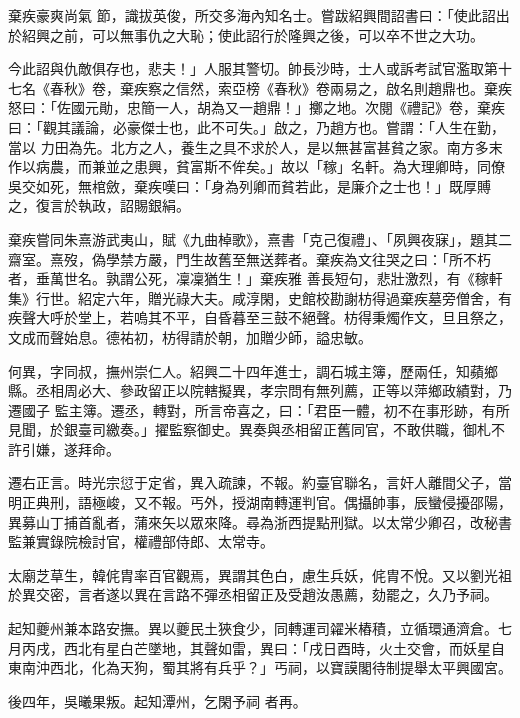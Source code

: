 \begin{pinyinscope}
 棄疾豪爽尚氣
 節，識拔英俊，所交多海內知名士。嘗跋紹興間詔書曰：「使此詔出於紹興之前，可以無事仇之大恥；使此詔行於隆興之後，可以卒不世之大功。



 今此詔與仇敵俱存也，悲夫！」人服其警切。帥長沙時，士人或訴考試官濫取第十七名《春秋》卷，棄疾察之信然，索亞榜《春秋》卷兩易之，啟名則趙鼎也。棄疾怒曰：「佐國元勛，忠簡一人，胡為又一趙鼎！」擲之地。次閱《禮記》卷，棄疾曰：「觀其議論，必豪傑士也，此不可失。」啟之，乃趙方也。嘗謂：「人生在勤，當以
 力田為先。北方之人，養生之具不求於人，是以無甚富甚貧之家。南方多末作以病農，而兼並之患興，貧富斯不侔矣。」故以「稼」名軒。為大理卿時，同僚吳交如死，無棺斂，棄疾嘆曰：「身為列卿而貧若此，是廉介之士也！」既厚賻之，復言於執政，詔賜銀絹。



 棄疾嘗同朱熹游武夷山，賦《九曲棹歌》，熹書「克己復禮」、「夙興夜寐」，題其二齋室。熹歿，偽學禁方嚴，門生故舊至無送葬者。棄疾為文往哭之曰：「所不朽者，垂萬世名。孰謂公死，凜凜猶生！」棄疾雅
 善長短句，悲壯激烈，有《稼軒集》行世。紹定六年，贈光祿大夫。咸淳閑，史館校勘謝枋得過棄疾墓旁僧舍，有疾聲大呼於堂上，若嗚其不平，自昏暮至三鼓不絕聲。枋得秉燭作文，旦且祭之，文成而聲始息。德祐初，枋得請於朝，加贈少師，謚忠敏。



 何異，字同叔，撫州崇仁人。紹興二十四年進士，調石城主簿，歷兩任，知蘋鄉縣。丞相周必大、參政留正以院轄擬異，孝宗問有無列薦，正等以萍鄉政績對，乃遷國子
 監主簿。遷丞，轉對，所言帝喜之，曰：「君臣一體，初不在事形跡，有所見聞，於銀臺司繳奏。」擢監察御史。異奏與丞相留正舊同官，不敢供職，御札不許引嫌，遂拜命。



 遷右正言。時光宗愆于定省，異入疏諫，不報。約臺官聯名，言奸人離間父子，當明正典刑，語極峻，又不報。丐外，授湖南轉運判官。偶攝帥事，辰蠻侵擾邵陽，異募山丁捕首亂者，蒲來矢以眾來降。尋為浙西提點刑獄。以太常少卿召，改秘書監兼實錄院檢討官，權禮部侍郎、太常寺。



 太廟芝草生，韓侂胄率百官觀焉，異謂其色白，慮生兵妖，侂胄不悅。又以劉光祖於異交密，言者遂以異在言路不彈丞相留正及受趙汝愚薦，劾罷之，久乃予祠。



 起知夔州兼本路安撫。異以夔民土狹食少，同轉運司糴米樁積，立循環通濟倉。七月丙戌，西北有星白芒墜地，其聲如雷，異曰：「戌日酉時，火土交會，而妖星自東南沖西北，化為天狗，蜀其將有兵乎？」丐祠，以寶謨閣待制提舉太平興國宮。



 後四年，吳曦果叛。起知潭州，乞閑予祠
 者再。




\end{pinyinscope}
